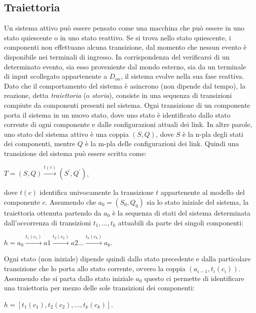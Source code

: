 \subsection{Traiettoria}
Un sistema attivo può essere pensato come una macchina che può essere in uno stato quiescente o in uno stato reattivo. Se si trova nello stato quiescente, i componenti non effettuano alcuna transizione, dal momento che nessun evento è disponibile nei terminali di ingresso. In corrispondenza del verificarsi di un determinato evento, sia esso proveniente dal mondo esterno, sia da un terminale di input scollegato appartenente a $D_{on}$, il sistema evolve nella sua fase reattiva. Dato che il comportamento del sistema è asincrono (non dipende dal tempo), la reazione, detta \emph{traiettoria} (o \emph{storia}), consiste in una sequenza di transizioni compiute da componenti presenti nel sistema.
Ogni transizione di un componente porta il sistema in un nuovo stato, dove uno stato è identificato dallo stato corrente di ogni componente e dalle configurazioni attuali dei link. In altre parole, uno stato del sistema attivo è una coppia $(S,Q)$, dove $S$ è la n-pla degli stati dei componenti, mentre $Q$ è la m-pla delle configurazioni dei link.
Quindi una transizione del sistema può essere scritta come:
\begin{center}
	$T = (S,Q) \xrightarrow {t(c)} (S^\prime,Q^\prime)$,
\end{center}
dove $t(c)$ identifica univocamente la transizione $t$ appartenente al modello del componente $c$.
Assumendo che $a_0 = (S_0,Q_0)$ sia lo stato iniziale del sistema, la traiettoria ottenuta partendo da $a_0$ è la sequenza di stati del sistema determinata dall'occorrenza di transizioni $t_1, \ldots , t_k$ attuabili da parte dei singoli componenti:
\begin{center}
$h = a_0 \xrightarrow{t_1(c_1)} a1 \xrightarrow{t_2(c_2)} a2 \ldots \xrightarrow{t_k(c_k)} a_k$.
\end{center}

Ogni stato (non iniziale) dipende quindi dallo stato precedente e dalla particolare transizione che lo porta allo stato corrente, ovvero la coppia $(a_{i-1},t_i(c_i))$. Assumendo che si parta dallo stato iniziale $a_0$ questo ci permette di identificare una traiettoria per mezzo delle sole transizioni dei componenti:
\begin{center}
$h = [t_1(c_1),t_2(c_2), \ldots , t_k(c_k)]$.
\end{center}

